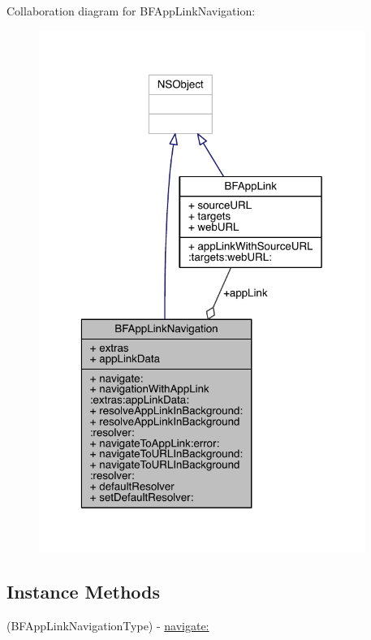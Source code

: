 Collaboration diagram for B\-F\-App\-Link\-Navigation\-:
\nopagebreak
\begin{figure}[H]
\begin{center}
\leavevmode
\includegraphics[width=301pt]{interface_b_f_app_link_navigation__coll__graph}
\end{center}
\end{figure}
\subsection*{Instance Methods}
\begin{DoxyCompactItemize}
\item 
(B\-F\-App\-Link\-Navigation\-Type) -\/ \hyperlink{interface_b_f_app_link_navigation_a5a03d67d7fb455e69907574022316792}{navigate\-:}
\end{DoxyCompactItemize}
